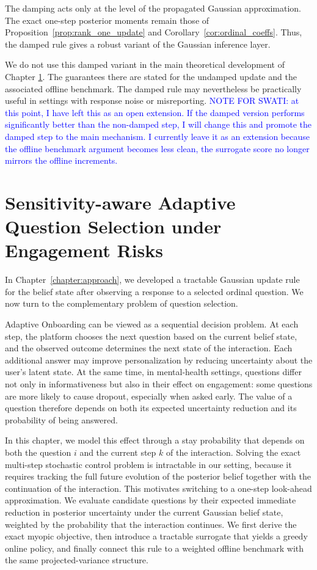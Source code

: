 \documentclass{article}
\begin{document}
The damping acts only at the level of the propagated Gaussian approximation. The
exact one-step posterior moments remain those of
Proposition~\ref{prop:rank_one_update} and
Corollary~\ref{cor:ordinal_coeffs}. Thus, the damped rule gives a robust variant
of the Gaussian inference layer.

We do not use this damped variant in the main theoretical development of
Chapter \ref{chapter:8}. The guarantees there are stated for the undamped update and the
associated offline benchmark. The damped rule may nevertheless be practically useful in settings with response noise or  misreporting.
\textcolor{blue}{NOTE FOR SWATI: at this point, I have left this as an open extension. If the damped version performs significantly better than the non-damped step, I will change this and promote the damped step to the main mechanism. I currently leave it as an extension because the offline benchmark argument becomes less clean, the surrogate score no longer mirrors the offline increments.}
\chapter{Sensitivity-aware Adaptive Question Selection under Engagement Risks}\label{chapter:8}

In Chapter~\ref{chapter:approach}, we developed a tractable Gaussian update rule for the belief
state after observing a response to a selected ordinal question. We now turn to the
complementary problem of question selection.

Adaptive Onboarding can be viewed as a sequential decision problem.
At each step, the platform
chooses the next question based on the current belief state, and the observed outcome
determines the next state of the interaction.  Each
additional answer may improve personalization by reducing uncertainty about the
user's latent state. At the same time, in mental-health settings, questions differ not only in informativeness but also in their effect on
engagement: some questions are more likely to cause dropout, especially when asked
early. The value of a question therefore depends on both its expected uncertainty
reduction and its probability of being answered.

 In this chapter, we model this effect through a stay probability that depends on both the question $i$ and the current step $k$ of the interaction.  Solving the exact multi-step stochastic
control problem is intractable in our setting, because it requires tracking the full
future evolution of the posterior belief together with the continuation of the
interaction. This motivates switching to a one-step look-ahead approximation. We evaluate candidate questions by their expected immediate reduction in posterior
uncertainty under the current Gaussian belief state, weighted by the probability that
the interaction continues. We first derive the exact myopic objective, then introduce
a tractable surrogate that yields a greedy online policy, and finally connect this
rule to a weighted offline benchmark with the same projected-variance structure.
\end{document}
